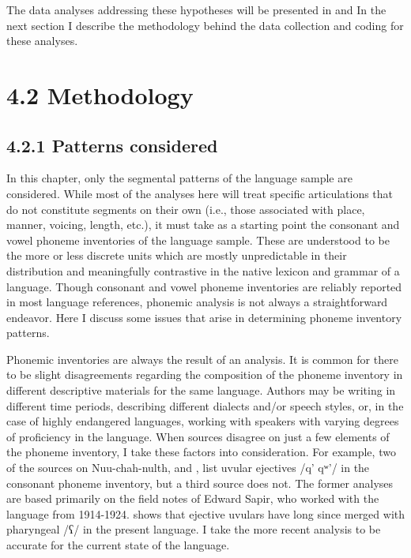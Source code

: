   The data analyses addressing these hypotheses will be presented in  and  In the next section I describe the methodology behind the data collection and coding for these analyses.


\section{4.2 Methodology}
\subsection{4.2.1 Patterns considered}

  In this chapter, only the segmental patterns of the language sample are considered. While most of the analyses here will treat specific articulations that do not constitute segments on their own (i.e., those associated with place, manner, voicing, length, etc.), it must take as a starting point the consonant and vowel phoneme inventories of the language sample. These are understood to be the more or less discrete units which are mostly unpredictable in their distribution and meaningfully contrastive in the native lexicon and grammar of a language. Though consonant and vowel phoneme inventories are reliably reported in most language references, phonemic analysis is not always a straightforward endeavor. Here I discuss some issues that arise in determining phoneme inventory patterns.



  Phonemic inventories are always the result of an analysis. It is common for there to be slight disagreements regarding the composition of the phoneme inventory in different descriptive materials for the same language. Authors may be writing in different time periods, describing different dialects and/or speech styles, or, in the case of highly endangered languages, working with speakers with varying degrees of proficiency in the language. When sources disagree on just a few elements of the phoneme inventory, I take these factors into consideration. For example, two of the sources on Nuu-chah-nulth, \citet{Stonham1999} and \citet{Davidson2002}, list uvular ejectives /q’ qʷ’/ in the consonant phoneme inventory, but a third source \citep{Kim2003} does not. The former analyses are based primarily on the field notes of Edward Sapir, who worked with the language from 1914-1924. \citet{Kim2003} shows that ejective uvulars have long since merged with pharyngeal /ʕ/ in the present language. I take the more recent analysis to be accurate for the current state of the language. 



